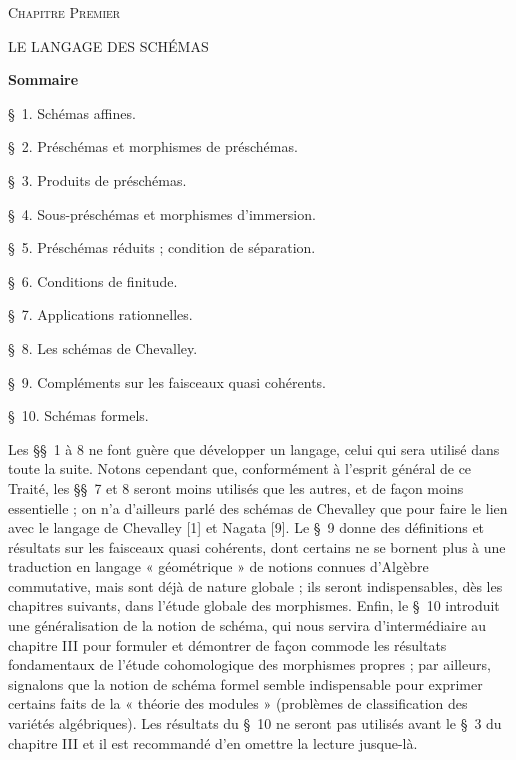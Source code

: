 \begin{center}
\textsc{Chapitre Premier}

LE LANGAGE DES SCHÉMAS

\textbf{Sommaire}
\end{center}

\noindent\S~1. Schémas affines.

\noindent\S~2. Préschémas et morphismes de préschémas.

\noindent\S~3. Produits de préschémas.

\noindent\S~4. Sous-préschémas et morphismes d’immersion.

\noindent\S~5. Préschémas réduits ; condition de séparation.

\noindent\S~6. Conditions de finitude.

\noindent\S~7. Applications rationnelles.

\noindent\S~8. Les schémas de Chevalley.

\noindent\S~9. Compléments sur les faisceaux quasi cohérents.

\noindent\S~10. Schémas formels.

Les \S\S~1 à 8 ne font guère que développer un langage, celui qui sera utilisé dans toute la suite. Notons cependant que, conformément à l’esprit général de ce Traité, les \S\S~7 et 8 seront moins utilisés que les autres, et de façon moins essentielle ; on n’a d’ailleurs parlé des schémas de Chevalley que pour faire le lien avec le langage de Chevalley [1] et Nagata [9]. Le \S~9 donne des définitions et résultats sur les faisceaux quasi cohérents, dont certains ne se bornent plus à une traduction en langage « géométrique » de notions connues d’Algèbre commutative, mais sont déjà de nature globale ; ils seront indispensables, dès les chapitres suivants, dans l’étude globale des morphismes. Enfin, le \S~10 introduit une généralisation de la notion de schéma, qui nous servira d’intermédiaire au chapitre III pour formuler et démontrer de façon commode les résultats fondamentaux de l’étude cohomologique des morphismes propres ; par ailleurs, signalons que la notion de schéma formel semble indispensable pour exprimer certains faits de la « théorie des modules » (problèmes de classification des variétés algébriques). Les résultats du \S~10 ne seront pas utilisés avant le \S~3 du chapitre III et il est recommandé d’en omettre la lecture jusque-là.
